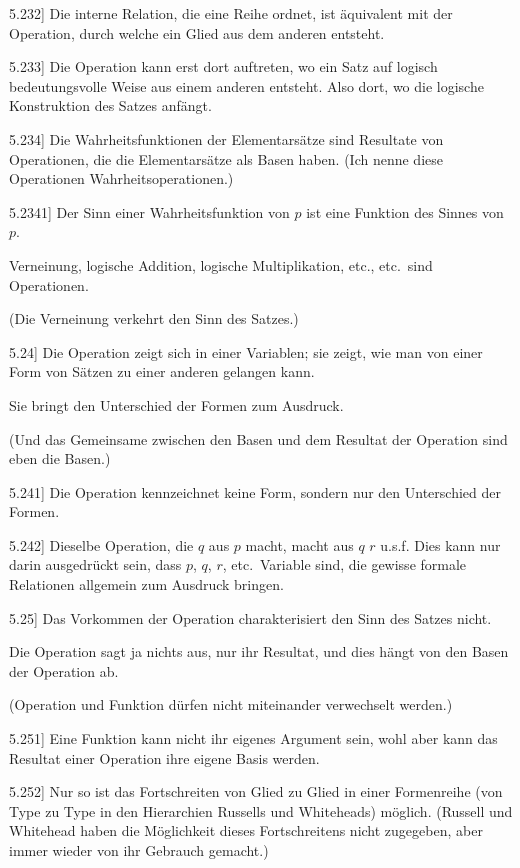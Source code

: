 \documentclass[12pt,oneside]{book}[2007/10/19]
\newcommand{\PropERef}[1]{\hyperref[PropE:#1]{#1}}
\newcommand{\PropositionG}[2]{%
  \item[\phantomsection\label{PropG:#1}\PropERef{#1}] #2%
}
\newcommand{\undSoFort}{u.\;s.\;f.}
\begin{document}
\begin{propositions}
\PropositionG{5.232}
{Die interne Relation, die eine Reihe ordnet, ist
äquivalent mit der Operation, durch welche ein
Glied aus dem anderen entsteht.}


\PropositionG{5.233}
{Die Operation kann erst dort auftreten, wo ein
Satz auf logisch bedeutungsvolle Weise aus einem
anderen entsteht. Also dort, wo die logische
Konstruktion des Satzes anfängt.}


\PropositionG{5.234}
{Die Wahrheitsfunktionen der Elementarsätze
sind Resultate von Operationen, die die Elementarsätze
als Basen haben. (Ich nenne diese Operationen
Wahrheitsoperationen.)}


\PropositionG{5.2341}
{Der Sinn einer Wahrheitsfunktion von $p$ ist
eine Funktion des Sinnes von $p$.

Verneinung, logische Addition, logische Multiplikation,
etc., etc.\ sind Operationen.

(Die Verneinung verkehrt den Sinn des Satzes.)}


\PropositionG{5.24}
{Die Operation zeigt sich in einer Variablen;
sie zeigt, wie man von einer Form von Sätzen zu
einer anderen gelangen kann.

Sie bringt den Unterschied der Formen zum
Ausdruck.

(Und das Gemeinsame zwischen den Basen
und dem Resultat der Operation sind eben die
Basen.)}


\PropositionG{5.241}
{Die Operation kennzeichnet keine Form, sondern
nur den Unterschied der Formen.}


\PropositionG{5.242}
{Dieselbe Operation, die \glqq{}$q$\grqq{} aus \glqq{}$p$\grqq{} macht,
macht aus \glqq{}$q$\grqq{} \glqq{}$r$\grqq{} \undSoFort{} Dies kann nur darin
ausgedrückt sein, dass \glqq{}$p$\grqq{}, \glqq{}$q$\grqq{}, \glqq{}$r$\grqq{}, etc.\ Variable
sind, die gewisse formale Relationen allgemein
zum Ausdruck bringen.}


\PropositionG{5.25}
{Das Vorkommen der Operation charakterisiert
den Sinn des Satzes nicht.

Die Operation sagt ja nichts aus, nur ihr Resultat,
und dies hängt von den Basen der Operation
ab.

(Operation und Funktion dürfen nicht miteinander
verwechselt werden.)}


\PropositionG{5.251}
{Eine Funktion kann nicht ihr eigenes Argument
sein, wohl aber kann das Resultat einer Operation
ihre eigene Basis werden.}


\PropositionG{5.252}
{Nur so ist das Fortschreiten von Glied zu Glied
in einer Formenreihe (von Type zu Type in den
Hierarchien Russells und Whiteheads) möglich.
(Russell und Whitehead haben die Möglichkeit
dieses Fortschreitens nicht zugegeben, aber immer
wieder von ihr Gebrauch gemacht.)}



\end{propositions}
\end{document}
